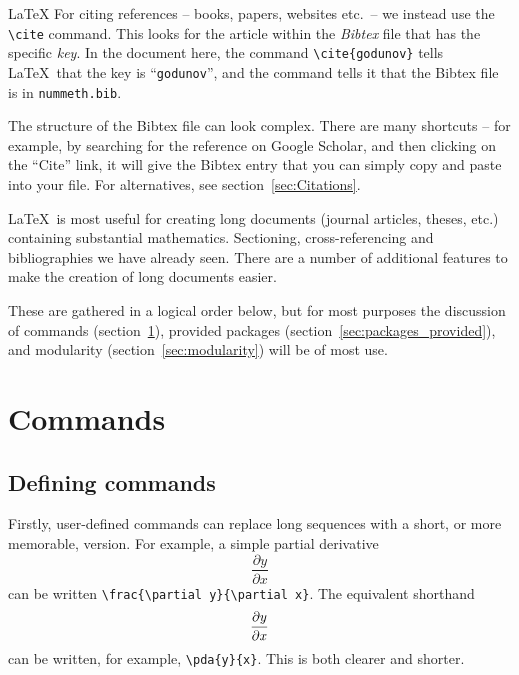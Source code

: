 \begin{chapter}{\LaTeX}
For citing references -- books, papers, websites etc.\ -- we instead use the \verb|\cite| command. This looks for the article within the \emph{Bibtex} file that has the specific \emph{key}. In the document here, the command \verb|\cite{godunov}| tells \LaTeX\ that the key is ``\verb|godunov|'', and the command \verb|| tells it that the Bibtex file is in \texttt{nummeth.bib}.

The structure of the Bibtex file can look complex. There are many shortcuts -- for example, by searching for the reference on Google Scholar, and then clicking on the ``Cite'' link, it will give the Bibtex entry that you can simply copy and paste into your file. For alternatives, see section~\ref{sec:Citations}.


\LaTeX\ is most useful for creating long documents (journal articles, theses, etc.) containing substantial mathematics. Sectioning, cross-referencing and bibliographies we have already seen. There are a number of additional features to make the creation of long documents easier.

These are gathered in a logical order below, but for most purposes the discussion of commands (section~\ref{sec:commands}), provided packages (section~\ref{sec:packages_provided}), and modularity (section~\ref{sec:modularity}) will be of most use.

\section{Commands}
\label{sec:commands}

\subsection{Defining commands}
\label{sec:commands_defn}

Firstly, user-defined commands can replace long sequences with a short, or more memorable, version. For example, a simple partial derivative
%
\begin{equation}
  \label{eq:example_pd_1}
  \frac{\partial y}{\partial x}
\end{equation}
%
can be written \verb|\frac{\partial y}{\partial x}|. The equivalent shorthand
%
\begin{equation}
  \label{eq:example_pd_2}
  \frac{\partial {y}}{\partial {x}}
\end{equation}
%
can be written, for example, \verb|\pda{y}{x}|. This is both clearer and shorter.


\end{chapter}

